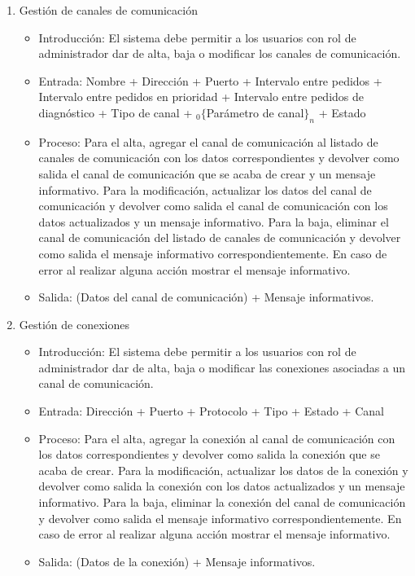 \begin{enumerate}
			\item Gestión de canales de comunicación
				\begin{itemize}
					\item Introducción: El sistema debe permitir a los usuarios con rol de administrador dar de alta, baja o modificar los canales de comunicación.
					\item Entrada: Nombre + Dirección + Puerto + Intervalo entre pedidos + Intervalo entre pedidos en prioridad + Intervalo entre pedidos de diagnóstico + Tipo de canal + ${}_{0}\{$Parámetro de canal$\}_n$ + Estado
					\item Proceso: Para el alta, agregar el canal de comunicación al listado de canales de comunicación con los datos correspondientes y devolver como salida el canal de comunicación que se acaba de crear y un mensaje informativo. Para la modificación, actualizar los datos del canal de comunicación y devolver como salida el canal de comunicación con los datos actualizados y un mensaje informativo. Para la baja, eliminar el canal de comunicación del listado de canales de comunicación y devolver como salida el mensaje informativo correspondientemente. En caso de error al realizar alguna acción mostrar el mensaje informativo.
					\item Salida: (Datos del canal de comunicación) + Mensaje informativos.
				\end{itemize}
						
			\item Gestión de conexiones
				\begin{itemize}
					\item Introducción: El sistema debe permitir a los usuarios con rol de administrador dar de alta, baja o modificar las conexiones asociadas a un canal de comunicación.
					\item Entrada: Dirección + Puerto + Protocolo + Tipo + Estado + Canal
					\item Proceso: Para el alta, agregar la conexión al canal de comunicación con los datos correspondientes y devolver como salida la conexión que se acaba de crear. Para la modificación, actualizar los datos de la conexión y devolver como salida la conexión con los datos actualizados y un mensaje informativo. Para la baja, eliminar la conexión del canal de comunicación y devolver como salida el mensaje informativo correspondientemente. En caso de error al realizar alguna acción mostrar el mensaje informativo.
					\item Salida: (Datos de la conexión) + Mensaje informativos.
				\end{itemize}
				

\end{enumerate}
